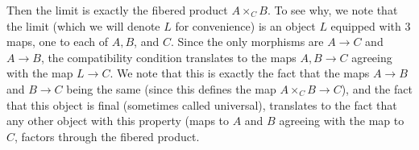 \documentclass[psamsfonts]{amsart}
\theoremstyle{definition}
\theoremstyle{remark}
\begin{document}
Then the limit is exactly the fibered product $A \times_C B$. To see why, we note that the limit (which we will denote $L$ for convenience) is an object $L$ equipped with $3$ maps, one to each of $A,B$, and $C$. Since the only morphisms are $A \to C$ and $A \to B$, the compatibility condition translates to the maps $A,B \to C$ agreeing with the map $L \to C$. We note that this is exactly the fact that the maps $A \to B$ and $B \to C$ being the same (since this defines the map $A \times_C B \to C$), and the fact that this object is final (sometimes called universal), translates to the fact that any other object with this property (maps to $A$ and $B$ agreeing with the map to $C$, factors through the fibered product.
%
\end{document}

